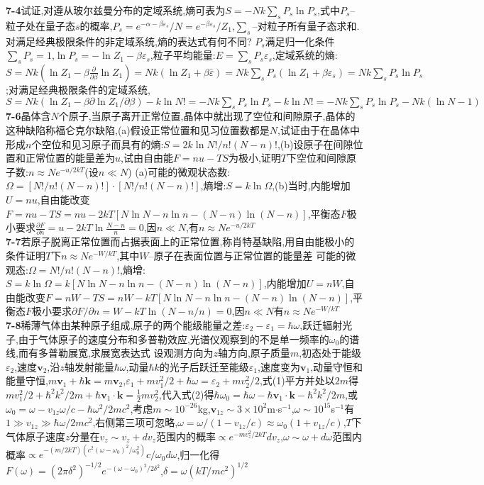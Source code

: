 \documentclass[10pt,a4paper]{article}
\begin{document}
\begin{multicols}{2}
\noindent\textbf{7-4}试证,对遵从玻尔兹曼分布的定域系统,熵可表为$S=-Nk\sum_sP_s\ln P_s$,式中$P_s$--粒子处在量子态$s$的概率,$P_s=e^{-\alpha-\beta\varepsilon_s}/N=e^{-\beta\varepsilon_s}/Z_1$,$\sum_s$--对粒子所有量子态求和.对满足经典极限条件的非定域系统,熵的表达式有何不同?\quad\quad
$P_s$满足归一化条件$\sum_sP_s=1$,$\ln P_s=-\ln Z_1-\beta\varepsilon_s$,粒子平均能量:$E=\sum_sP_s\varepsilon_s$,定域系统的熵:$S=Nk(\ln Z_1-\beta\frac{\partial}{\partial\beta}\ln Z_1)=Nk(\ln Z_1+\beta\bar{\varepsilon})=Nk\sum_sP_s(\ln Z_1+\beta\varepsilon_s)=Nk\sum_sP_s\ln P_s$;对满足经典极限条件的定域系统,$S=Nk(\ln Z_1-\beta\partial\ln Z_1/\partial\beta)-k\ln N!=-Nk\sum_sP_s\ln P_s-k\ln N!=-Nk\sum_sP_s\ln P_s-Nk(\ln N-1)$\\
\textbf{7-6}晶体含$N$个原子,当原子离开正常位置,晶体中就出现了空位和间隙原子,晶体的这种缺陷称福仑克尔缺陷,(a)假设正常位置和见习位置数都是$N$,试证由于在晶体中形成$n$个空位和见习原子而具有的熵:$S=2k\ln N!/n!(N-n)!$,(b)设原子在间隙位置和正常位置的能量差为$u$,试由自由能$F=nu-TS$为极小,证明$T$下空位和间隙原子数:$n\approx Ne^{-u/2kT}$(设$n\ll N$)\quad\quad
(a)可能的微观状态数:$\Omega=[N!/n!(N-n)!]\cdot[N!/n!(N-n)!]$,熵增:$S=k\ln\Omega$,(b)当时,内能增加$U=nu$,自由能改变$F=nu-TS=nu-2kT[N\ln N-n\ln n-(N-n)\ln(N-n)]$,平衡态$F$极小要求$\frac{\partial F}{\partial n}=u-2kT\ln\frac{N-n}{n}=0$,因$n\ll N$,有$n\approx Ne^{-u/2kT}$\\
\textbf{7-7}若原子脱离正常位置而占据表面上的正常位置,称肖特基缺陷,用自由能极小的条件证明$T$下$n\approx Ne^{-W/kT}$,其中$W$--原子在表面位置与正常位置的能量差\quad\quad
可能的微观态:$\Omega=N!/n!(N-n)!$,熵增:$S=k\ln\Omega=k[N\ln N-n\ln n-(N-n)\ln(N-n)]$,内能增加$U=nW$,自由能改变$F=nW-TS=nW-kT[N\ln N-n\ln n-(N-n)\ln(N-n)]$,平衡态$F$极小要求$\partial F/\partial n=W-kT\ln(N-n/n)=0$,因$n\ll N$有$n\approx Ne^{-W/kT}$\\
\textbf{7-8}稀薄气体由某种原子组成,原子的两个能级能量之差:$\varepsilon_2-\varepsilon_1=\hbar\omega$,跃迁辐射光子,由于气体原子的速度分布和多普勒效应,光谱仪观察到的不是单一频率的$\omega_0$的谱线,而有多普勒展宽,求展宽表达式\quad\quad
设观测方向为$z$轴方向,原子质量$m$,初态处于能级$\varepsilon_2$,速度$\bm{v}_2$,沿$z$轴发射能量$\hbar\omega$,动量$\hbar k$的光子后跃迁至能级$\varepsilon_1$,速度变为$\bm{v}_1$,动量守恒和能量守恒,$m\bm{v}_1+\hbar\bm{k}=m\bm{v}_2$,$\varepsilon_1+mv_1^2/2+\hbar\omega=\varepsilon_2+mv_2^2/2$,式(1)平方并处以$2m$得$mv_1^2/2+\hbar^2k^2/2m+\hbar\bm{v}_1\cdot\bm{k}=\frac{1}{2}mv_2^2$,代入式(2)得$\hbar\omega_0=\hbar\omega-\hbar\bm{v}_1\cdot\bm{k}-\hbar^2k^2/2m$,或$\omega_0=\omega-v_{1z}\omega/c-\hbar\omega^2/2mc^2$,考虑$m\sim10^{-26}$kg,$\bm{v}_{1z}\sim3\times10^2$m$\cdot$s$^{-1}$,$\omega\sim10^{15}$s$^{-1}$有$1\gg v_{1z}\gg\hbar\omega/2mc^2$,右侧第三项可忽略,$\omega=\omega/(1-v_{1z}/c)\approx\omega_0(1+v_{1z}/c)$,$T$下气体原子速度$z$分量在$v_z\sim v_z+dv_z$范围内的概率$\propto e^{-mv_z^2/2kT}dv_z$,$\omega\sim\omega+d\omega$范围内概率$\propto e^{-(m/2kT)(c^2(\omega-\omega_0)^2/\omega_0^2)}c/\omega_0d\omega$,归一化得$F(\omega)=(2\pi\delta^2)^{-1/2}e^{-(\omega-\omega_0)^2/2\delta^2}$,$\delta=\omega(kT/mc^2)^{1/2}$\\

\end{multicols}
\end{document}
